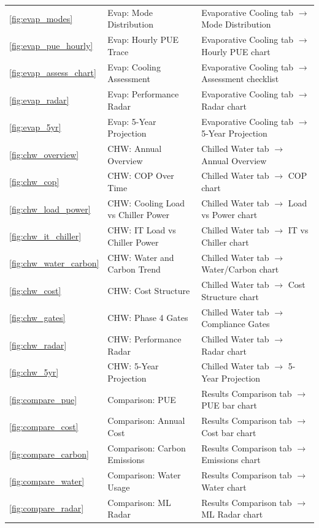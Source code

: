 \documentclass[12pt,a4paper]{report}
\begin{document}
\begin{table}[H]
\begin{tabular}{p{2cm}p{5cm}p{7cm}}
\ref{fig:evap_modes} & Evap: Mode Distribution & Evaporative Cooling tab $\to$ Mode Distribution \\
\ref{fig:evap_pue_hourly} & Evap: Hourly PUE Trace & Evaporative Cooling tab $\to$ Hourly PUE chart \\
\ref{fig:evap_assess_chart} & Evap: Cooling Assessment & Evaporative Cooling tab $\to$ Assessment checklist \\
\ref{fig:evap_radar} & Evap: Performance Radar & Evaporative Cooling tab $\to$ Radar chart \\
\ref{fig:evap_5yr} & Evap: 5-Year Projection & Evaporative Cooling tab $\to$ 5-Year Projection \\
\ref{fig:chw_overview} & CHW: Annual Overview & Chilled Water tab $\to$ Annual Overview \\
\ref{fig:chw_cop} & CHW: COP Over Time & Chilled Water tab $\to$ COP chart \\
\ref{fig:chw_load_power} & CHW: Cooling Load vs Chiller Power & Chilled Water tab $\to$ Load vs Power chart \\
\ref{fig:chw_it_chiller} & CHW: IT Load vs Chiller Power & Chilled Water tab $\to$ IT vs Chiller chart \\
\ref{fig:chw_water_carbon} & CHW: Water and Carbon Trend & Chilled Water tab $\to$ Water/Carbon chart \\
\ref{fig:chw_cost} & CHW: Cost Structure & Chilled Water tab $\to$ Cost Structure chart \\
\ref{fig:chw_gates} & CHW: Phase 4 Gates & Chilled Water tab $\to$ Compliance Gates \\
\ref{fig:chw_radar} & CHW: Performance Radar & Chilled Water tab $\to$ Radar chart \\
\ref{fig:chw_5yr} & CHW: 5-Year Projection & Chilled Water tab $\to$ 5-Year Projection \\
\ref{fig:compare_pue} & Comparison: PUE & Results Comparison tab $\to$ PUE bar chart \\
\ref{fig:compare_cost} & Comparison: Annual Cost & Results Comparison tab $\to$ Cost bar chart \\
\ref{fig:compare_carbon} & Comparison: Carbon Emissions & Results Comparison tab $\to$ Emissions chart \\
\ref{fig:compare_water} & Comparison: Water Usage & Results Comparison tab $\to$ Water chart \\
\ref{fig:compare_radar} & Comparison: ML Radar & Results Comparison tab $\to$ ML Radar chart \\
\bottomrule
\end{tabular}
\end{table}
\end{document}
